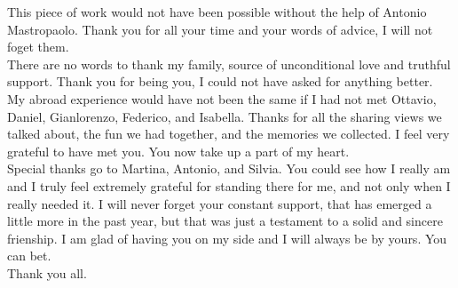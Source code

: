\begin{acknowledgements}
This piece of work would not have been possible without the help of Antonio Mastropaolo. 
Thank you for all your time and your words of advice, I will not foget them.\\

There are no words to thank my family, source of unconditional love and truthful support. 
Thank you for being you, I could not have asked for anything better.\\

My abroad experience would have not been the same if I had not met Ottavio, Daniel, Gianlorenzo, Federico, and Isabella. 
Thanks for all the sharing views we talked about, the fun we had together, and the memories we collected. I feel very grateful to have met you.
You now take up a part of my heart.\\

Special thanks go to Martina, Antonio, and Silvia. 
You could see how I really am and I truly feel extremely grateful 
for standing there for me, and not only when I really needed it. 
I will never forget your constant support, that has emerged a little more in the past year, but that was 
just a testament to a solid and sincere frienship. I am glad of having you on my side and I will always be by yours.
You can bet.\\

Thank you all.
\end{acknowledgements}